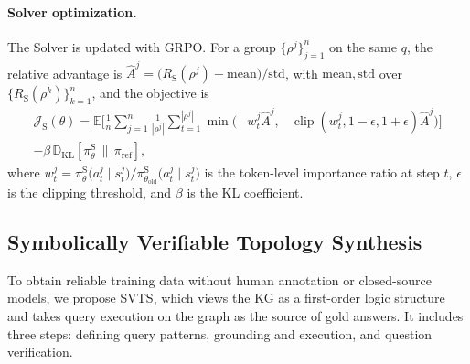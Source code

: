 \paragraph{Solver optimization.}
The Solver is updated with GRPO. For a group $\{\rho^{j}\}_{j=1}^{n}$ on the same $q$, the relative advantage is $\hat{A}^{j}=\bigl(R_{\mathrm{S}}(\rho^{j})-\mathrm{mean}\bigr)/\mathrm{std}$, with $\mathrm{mean},\mathrm{std}$ over $\{R_{\mathrm{S}}(\rho^{k})\}_{k=1}^{n}$, and the objective is
\begin{equation}
\label{eq:grpo}
\begin{aligned}
\mathcal{J}_{\mathrm{S}}(\theta)
=\mathbb{E}\!\Bigg[\frac1n\sum_{j=1}^{n}\frac{1}{|\rho^{j}|}
\sum_{t=1}^{|\rho^{j}|}
\min\!\Big(&w^{j}_{t}\hat{A}^{j},
&\operatorname{clip}(w^{j}_{t},1-\epsilon,1+\epsilon)\hat{A}^{j}\Big)\Bigg]\\
-\beta\,\mathbb{D}_{\mathrm{KL}}\!\left[\pi_\theta^{\mathrm{S}}\,\|\,\pi_{\mathrm{ref}}\right],
\end{aligned}
\end{equation}
where $w^{j}_{t}=\pi_\theta^{\mathrm{S}}\bigl(a^{j}_{t}\mid s^{j}_{t}\bigr)/\pi_{\theta_{\mathrm{old}}}^{\mathrm{S}}\bigl(a^{j}_{t}\mid s^{j}_{t}\bigr)$ is the token-level importance ratio at step $t$, $\epsilon$ is the clipping threshold, and $\beta$ is the KL coefficient.

\subsection{Symbolically Verifiable Topology Synthesis}
\label{sec:svts}

To obtain reliable training data without human annotation or closed-source models, we propose SVTS, which views the KG as a first-order logic structure and takes query execution on the graph as the source of gold answers. It includes three steps: defining query patterns, grounding and execution, and question verification.

